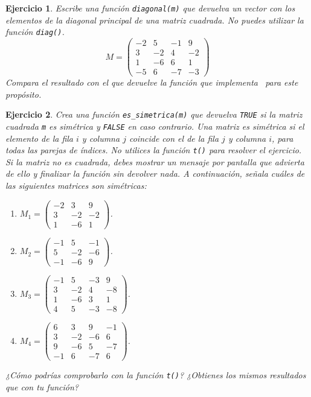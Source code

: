 \documentclass[11pt,a4paper]{article}
\newcommand{\R}{\textcolor{azuluc}{\faIcon{r-project}}}
\theoremstyle{exercise}
\newtheorem{exercise}{Ejercicio}
\begin{document}
\begin{exercise}
Escribe una función \texttt{diagonal(m)} que devuelva un vector con los elementos de la diagonal principal de una matriz cuadrada. No puedes utilizar la función \texttt{diag()}.
\[
M = 
\left( 
	\begin{array}{rrrr}
		-2 &  5 & -1 &  9 \\
		 3 & -2 &  4 & -2 \\
		 1 & -6 &  6 &  1 \\
		-5 &  6 & -7 & -3
	\end{array}
\right)
\]
Compara el resultado con el que devuelve la función que implementa \R\ para este propósito.
\end{exercise}

\begin{exercise}
Crea una función \texttt{es\_simetrica(m)} que devuelva \texttt{TRUE} si la matriz cuadrada \texttt{m} es simétrica y \texttt{FALSE} en caso contrario. Una matriz es simétrica si el elemento de la fila $i$ y columna $j$ coincide con el de la fila $j$ y columna $i$, para todas las parejas de índices. No utilices la función \texttt{t()} para resolver el ejercicio. Si la matriz no es cuadrada, debes mostrar un mensaje por pantalla que advierta de ello y finalizar la función sin devolver nada. A continuación, señala cuáles de las siguientes matrices son simétricas:
\begin{enumerate}
	\item[a)] $M_1 = 
		\left( 
			\begin{array}{rrrr}
				-2 &  3 &  9 \\
				 3 & -2 & -2 \\
				 1 & -6 &  1 
			\end{array}
		\right)$.
	\item[b)] $M_2 = 
		\left( 
			\begin{array}{rrr}
				-1 &  5 & -1 \\
				 5 & -2 & -6 \\
				-1 & -6 &  9 
			\end{array}
		\right)$.
	\item[c)] $M_3 = 
		\left( 
			\begin{array}{rrrr}
			-1 &  5 & -3 &  9 \\
			 3 & -2 &  4 & -8 \\
			 1 & -6 &  3 &  1 \\
			 4 &  5 & -3 & -8
		\end{array}
		\right)$.
	\item[d)] $M_4 = 
		\left( 
			\begin{array}{rrrr}
			 6 &  3 &  9 & -1 \\
			 3 & -2 & -6 &  6 \\
			 9 & -6 &  5 & -7 \\
			-1 &  6 & -7 &  6
		\end{array}
		\right)$.
\end{enumerate}
¿Cómo podrías comprobarlo con la función \texttt{t()}? ¿Obtienes los mismos resultados que con tu función?
\end{exercise}
\end{document}
